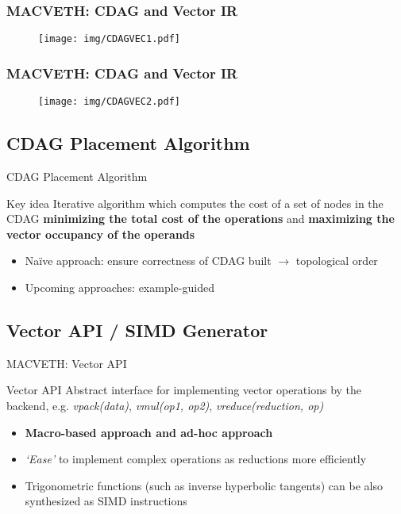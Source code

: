 \documentclass[xcolor=table,hideothersubsections,aspectratio=1610]{beamer}
\begin{document}
\begin{frame}[fragile]
    \frametitle{MACVETH: CDAG and Vector IR}
    \begin{figure}
        \centering
        \texttt{[image: img/CDAGVEC1.pdf]}
    \end{figure}
\end{frame}

\begin{frame}[fragile]
    \frametitle{MACVETH: CDAG and Vector IR}
    \begin{figure}
        \centering
        \texttt{[image: img/CDAGVEC2.pdf]}
    \end{figure}
\end{frame}


\subsection{CDAG Placement Algorithm}
\begin{frame}{CDAG Placement Algorithm}
    \begin{block}{Key idea}
        Iterative algorithm which computes the cost of a set of nodes in the CDAG \textbf{minimizing the total cost of the operations} and \textbf{maximizing the vector occupancy of the operands}
    \end{block}

    \begin{itemize}
        \item Naïve approach: ensure correctness of CDAG built $\rightarrow$ topological order
        \item Upcoming approaches: example-guided
    \end{itemize}

\end{frame}


\subsection{Vector API / SIMD Generator}
\begin{frame}{MACVETH: Vector API}
    \begin{block}{Vector API}
        Abstract interface for implementing vector operations by the backend, e.g.\textit{ vpack(data)}, \textit{vmul(op1, op2)}, \textit{vreduce(reduction, op)}
    \end{block}
    \begin{itemize}
        \item \textbf{Macro-based approach and ad-hoc approach}
        \item \textit{`Ease'} to implement complex operations as reductions more efficiently
        \item Trigonometric functions (such as inverse hyperbolic tangents) can be also synthesized as SIMD instructions
    \end{itemize}
\end{frame}
\end{document}
